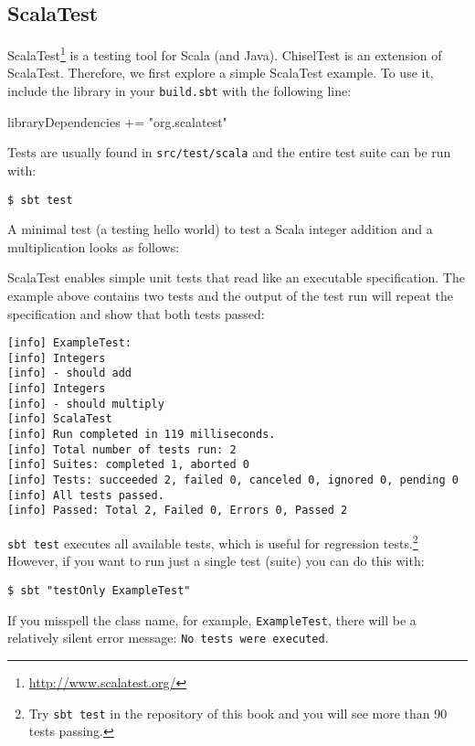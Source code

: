 \documentclass[%
    10pt,
    headinclude, footexclude,
    openright, %
    notitlepage,
    cleardoubleempty,
    headsepline,
    pointlessnumbers,
    bibtotoc, idxtotoc,
    ]{scrbook}
\newcommand{\code}[1]{{\lstinline[basicstyle=\small\ttfamily]{#1}}}
\newcommand{\codefoot}[1]{{\lstinline[basicstyle=\footnotesize\ttfamily]{#1}}}
\newcommand{\myref}[2]{\href{#1}{#2}}
\renewcommand{\myref}[2]{{#2}{\footnote{\url{#1}}}}
\begin{document}
\subsection{ScalaTest}

\myref{http://www.scalatest.org/}{ScalaTest} is a testing tool for Scala (and Java). ChiselTest is an extension
of ScalaTest. Therefore, we first explore a simple ScalaTest example. To use it, include the library
in your \code{build.sbt} with the following line:

\begin{chisel}
libraryDependencies += "org.scalatest" %
\end{chisel}

\noindent Tests are usually found in \code{src/test/scala} and the entire test suite can be run with:

\begin{verbatim}
$ sbt test
\end{verbatim}

\noindent A minimal test (a testing hello world) to test a Scala integer
addition and a multiplication looks as follows:


ScalaTest enables simple unit tests that read like an executable specification.
The example above contains two tests and the output of the test run will repeat the specification
and show that both tests passed:

\begin{verbatim}
[info] ExampleTest:
[info] Integers
[info] - should add
[info] Integers
[info] - should multiply
[info] ScalaTest
[info] Run completed in 119 milliseconds.
[info] Total number of tests run: 2
[info] Suites: completed 1, aborted 0
[info] Tests: succeeded 2, failed 0, canceled 0, ignored 0, pending 0
[info] All tests passed.
[info] Passed: Total 2, Failed 0, Errors 0, Passed 2
\end{verbatim}


\code{sbt test} executes all available tests, which is useful for regression
tests.\footnote{Try \codefoot{sbt test} in the repository of this book and you
will see more than 90 tests passing.}
However, if you want to run just a single test (suite) you can do this with:

\begin{verbatim}
$ sbt "testOnly ExampleTest"
\end{verbatim}

\noindent If you misspell the class name, for example, \code{ExampleTest},
there will be a relatively silent error message: \code{No tests were executed}.
\end{document}
